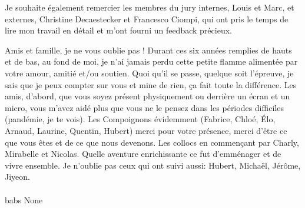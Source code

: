 \vspace{15pt}

Je souhaite également remercier les membres du jury internes, Louis et Marc, et externes, Christine Decaestecker et Francesco Ciompi, qui ont pris le temps de lire mon travail en détail et m'ont fourni un feedback précieux.

\vspace{15pt} 

Amis et famille, je ne vous oublie pas ! Durant ces six années remplies de hauts et de bas, au fond de moi, je n'ai jamais perdu cette petite flamme alimentée par votre amour, amitié et/ou soutien. Quoi qu'il se passe, quelque soit l'épreuve, je sais que je peux compter sur vous et mine de rien, ça fait toute la différence. Les amis, d'abord, que vous soyez présent physiquement ou derrière un écran et un micro, vous m'avez aidé plus que vous ne le pensez dans les périodes difficiles (pandémie, je te vois). Les Compoignons évidemment (Fabrice, Chloé, Élo, Arnaud, Laurine, Quentin, Hubert) merci pour votre présence, merci d'être ce que vous êtes et de ce que nous devenons. Les collocs en commençant par Charly, Mirabelle et Nicolas. Quelle aventure enrichissante ce fut d'emménager et de vivre ensemble. Je n'oublie pas ceux qui ont suivi aussi: Hubert, Michaël, Jérôme, Jiyeon. 


\paragraph{}
babs
None






